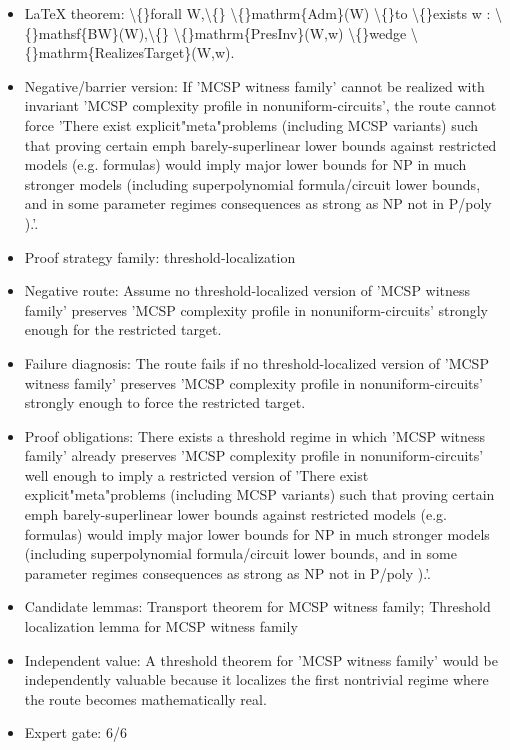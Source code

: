 \documentclass[11pt]{article}
\begin{document}
\begin{itemize}
\item LaTeX theorem: \textbackslash\{\}forall W,\textbackslash\{\} \textbackslash\{\}mathrm\{Adm\}(W) \textbackslash\{\}to \textbackslash\{\}exists w : \textbackslash\{\}mathsf\{BW\}(W),\textbackslash\{\} \textbackslash\{\}mathrm\{PresInv\}(W,w) \textbackslash\{\}wedge \textbackslash\{\}mathrm\{RealizesTarget\}(W,w).
\item Negative/barrier version: If 'MCSP witness family' cannot be realized with invariant 'MCSP complexity profile in nonuniform-circuits', the route cannot force 'There exist explicit"meta"problems (including MCSP variants) such that proving certain emph barely-superlinear lower bounds against restricted models (e.g. formulas) would imply major lower bounds for NP in much stronger models (including superpolynomial formula/circuit lower bounds, and in some parameter regimes consequences as strong as NP not in P/poly ).'.
\item Proof strategy family: threshold-localization
\item Negative route: Assume no threshold-localized version of 'MCSP witness family' preserves 'MCSP complexity profile in nonuniform-circuits' strongly enough for the restricted target.
\item Failure diagnosis: The route fails if no threshold-localized version of 'MCSP witness family' preserves 'MCSP complexity profile in nonuniform-circuits' strongly enough to force the restricted target.
\item Proof obligations: There exists a threshold regime in which 'MCSP witness family' already preserves 'MCSP complexity profile in nonuniform-circuits' well enough to imply a restricted version of 'There exist explicit"meta"problems (including MCSP variants) such that proving certain emph barely-superlinear lower bounds against restricted models (e.g. formulas) would imply major lower bounds for NP in much stronger models (including superpolynomial formula/circuit lower bounds, and in some parameter regimes consequences as strong as NP not in P/poly ).'.
\item Candidate lemmas: Transport theorem for MCSP witness family; Threshold localization lemma for MCSP witness family
\item Independent value: A threshold theorem for 'MCSP witness family' would be independently valuable because it localizes the first nontrivial regime where the route becomes mathematically real.
\item Expert gate: 6/6
\end{itemize}
\end{document}
